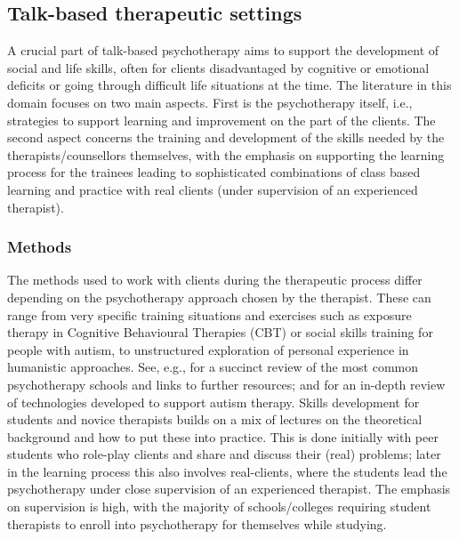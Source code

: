 \documentclass[prodmode,acmtochi]{acmsmall}
\newcommand{\rephrase}[1]{\textrm{\textrm{\textcolor{gray}{#1}}}}
\begin{document}

\subsection{Talk-based therapeutic settings}
A crucial part of talk-based psychotherapy aims to support the development of social and life skills, often for clients  disadvantaged by cognitive or emotional deficits or going through difficult life situations at the time. %
%
The literature in this domain focuses on two main aspects. First is the psychotherapy itself, i.e., strategies to support learning and improvement on the part of the clients. The second aspect concerns the training and development of the skills needed by the therapists/counsellors themselves, with the emphasis on supporting the learning process for the trainees leading to sophisticated combinations of class based learning and practice with real clients (under supervision of an experienced therapist). 



\subsubsection*{Methods}  
The methods used to work with clients during the therapeutic process differ depending on the psychotherapy approach chosen by the therapist. These can range from very specific training situations and exercises such as exposure therapy in Cognitive Behavioural Therapies (CBT) or social skills training for people with autism, to unstructured exploration of personal experience in humanistic approaches.  See, e.g.,  for a succinct review of the most common psychotherapy schools and links to further resources; and \cite{Kientz2013} for an in-depth review of technologies developed to support autism therapy. 
%
Skills development for students and novice therapists builds on a mix of lectures on the theoretical background and how to put these into practice. This is done initially with peer students who role-play clients and share and discuss their (real) problems; later in the learning process this also involves real-clients, where the students lead the psychotherapy under close supervision of an experienced therapist. The emphasis on supervision is high, with the majority of schools/colleges requiring student therapists to enroll into psychotherapy for themselves while studying. 
\end{document}
